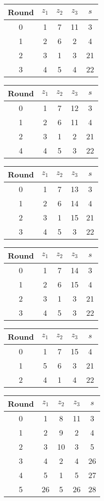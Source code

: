\begin{multicols}{2}
\begin{tabular}{c | c | c | c | c }
Round & $z_1$ & $z_2$ & $z_3$ & $s$ \\
\hline
0 & 1 & 7 & 11 & 3 \\
1 & 2 & 6 & 2 & 4 \\
2 & 3 & 1 & 3 & 21 \\
3 & 4 & 5 & 4 & 22
\end{tabular}


\begin{tabular}{c | c | c | c | c }
Round & $z_1$ & $z_2$ & $z_3$ & $s$ \\
\hline
0 & 1 & 7 & 12 & 3 \\
1 & 2 & 6 & 11 & 4 \\
2 & 3 & 1 & 2 & 21 \\
4 & 4 & 5 & 3 & 22
\end{tabular}


\begin{tabular}{c | c | c | c | c }
Round & $z_1$ & $z_2$ & $z_3$ & $s$ \\
\hline
0 & 1 & 7 & 13 & 3 \\
1 & 2 & 6 & 14 & 4 \\
2 & 3 & 1 & 15 & 21 \\
3 & 4 & 5 & 3 & 22
\end{tabular}


\begin{tabular}{c | c | c | c | c }
Round & $z_1$ & $z_2$ & $z_3$ & $s$ \\
\hline
0 & 1 & 7 & 14 & 3 \\
1 & 2 & 6 & 15 & 4 \\
2 & 3 & 1 & 3 & 21 \\
3 & 4 & 5 & 3 & 22
\end{tabular}


\begin{tabular}{c | c | c | c | c }
Round & $z_1$ & $z_2$ & $z_3$ & $s$ \\
\hline
0 & 1 & 7 & 15 & 4 \\
1 & 5 & 6 & 3 & 21 \\
2 & 4 & 1 & 4 & 22 \\
\end{tabular}


\begin{tabular}{c | c | c | c | c }
Round & $z_1$ & $z_2$ & $z_3$ & $s$ \\
\hline
0 & 1 & 8 & 11 & 3 \\
1 & 2 & 9 & 2 & 4 \\
2 & 3 & 10 & 3 & 5 \\
3 & 4 & 2 & 4 & 26 \\
4 & 5 & 1 & 5 & 27 \\
5 & 26 & 5 & 26 & 28
\end{tabular}




\end{multicols}
